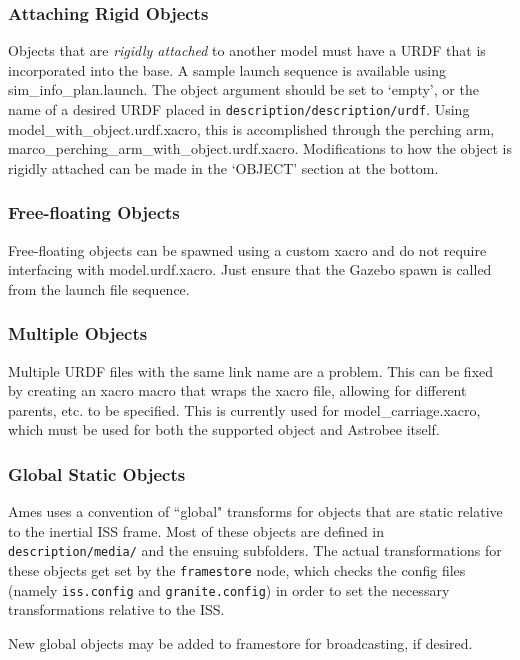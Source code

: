 \documentclass{article}
\begin{document}
\subsubsection{Attaching Rigid Objects}

Objects that are \textit{rigidly attached} to another model must have a URDF that is incorporated into the base. A sample launch sequence is available using sim\_info\_plan.launch. The object argument should be set to `empty', or the name of a desired URDF placed in \texttt{description/description/urdf}. Using model\_with\_object.urdf.xacro, this is accomplished through the perching arm, marco\_perching\_arm\_with\_object.urdf.xacro. Modifications to how the object is rigidly attached can be made in the `OBJECT' section at the bottom.

\subsubsection{Free-floating Objects}

Free-floating objects can be spawned using a custom xacro and do not require interfacing with model.urdf.xacro. Just ensure that the Gazebo spawn is called from the launch file sequence.

\subsubsection{Multiple Objects}

Multiple URDF files with the same link name are a problem. This can be fixed by creating an xacro macro that wraps the xacro file, allowing for different parents, etc. to be specified. This is currently used for model\_carriage.xacro, which must be used for both the supported object and Astrobee itself.

\subsubsection{Global Static Objects}

Ames uses a convention of ``global" transforms for objects that are static relative to the inertial ISS frame. Most of these objects are defined in \texttt{description/media/} and the ensuing subfolders. The actual transformations for these objects get set by the \texttt{framestore} node, which checks the config files (namely \texttt{iss.config} and \texttt{granite.config}) in order to set the necessary transformations relative to the ISS.

New global objects may be added to framestore for broadcasting, if desired.
\end{document}
